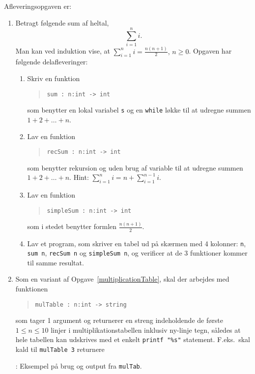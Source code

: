 \documentclass[a4paper,12pt]{article}
\begin{document}
Afleveringsopgaven er:
\begin{enumerate}[label=3i.\arabic*,start=0]
\item Betragt følgende sum af heltal,
  \begin{equation}
    \sum_{i=1}^n i.
  \end{equation}
  Man kan ved induktion vise, at $\sum_{i=1}^n i = \frac{n(n+1)}{2},\, n\geq 0$. Opgaven har følgende delafleveringer:
  \begin{enumerate}
  \item \label{sum} Skriv en funktion
    \begin{quote}
      \mbox{\lstinline!sum : n:int -> int!}
    \end{quote}
    som benytter en lokal variabel \lstinline!s! og en \lstinline!while! løkke til at udregne summen $1 + 2 + \dots + n$.
  \item Lav en funktion
    \begin{quote}
      \mbox{\lstinline!recSum : n:int -> int!}
    \end{quote}
 som benytter rekursion og uden brug af variable til at udregne summen $1 + 2 + \dots + n$. Hint: $\sum_{i=1}^n i = n + \sum_{i=1}^{n-1} i$.
  \item Lav en funktion
    \begin{quote}
      \mbox{\lstinline!simpleSum : n:int -> int!}
    \end{quote}
som i stedet benytter formlen $\frac{n(n+1)}{2}$.
  \item Lav et program, som skriver en tabel ud på skærmen med 4 kolonner: \lstinline!n!, \lstinline!sum n!, \mbox{\lstinline!recSum n!} og \mbox{\lstinline!simpleSum n!}, og verificer at de 3 funktioner kommer til samme resultat.
  \end{enumerate}
\item Som en variant af Opgave~\ref{multiplicationTable}, skal der arbejdes med funktionen
  \begin{quote}
    \mbox{\lstinline!mulTable : n:int -> string!}
  \end{quote}
  som tager 1 argument og returnerer en streng indeholdende de første $1\leq n\leq 10$ linjer i multiplikationstabellen inklusiv ny-linje tegn, således at hele tabellen kan udskrives med et enkelt \lstinline!printf "%s"! statement. F.eks.\ skal kald til \mbox{\lstinline!mulTable 3!} returnere
  \begin{codeNOutput}[label=mulTab]{: Eksempel på brug og output fra \lstinline!mulTab!.}
\begin{lstlisting}

\end{lstlisting}
\end{codeNOutput}
\end{enumerate}
\end{document}
